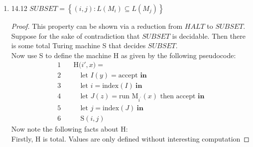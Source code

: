 \documentclass[10pt]{article}
\begin{document}
\begin{enumerate}[label={}]
\begin{proof}
                  Thus we know that $\mathcal{L}(H)=H A L T$ and $H$ is total. In other words, $H$ decides $H A L T$. However, $HALT$ is known to be undecidable (see Theorem 14.7 from the textbook). Thus, there is a contradiction, and the assumption that $HASEMPTY$ is decidable must be false. Therefore, $HASEMPTY$ is in fact undecidable.

            \end{proof}

            \newpage





      \item 14.12 $SUBSET=\left\{(i, j): L\left(M_i\right) \subseteq L\left(M_j\right)\right\}$

            \begin{proof}
                  This property can be shown via a reduction from $HALT$ to $SUBSET$.\\
                  Suppose for the sake of contradiction that $SUBSET$ is decidable.
                  Then there is some total Turing machine S that decides $SUBSET$.\\
                  Now use S to define the machine H as given by the following pseudocode:
                  $$\begin{aligned}
                              1 \quad & \text{H(}i', x\text{)} =                                                                       \\
                              2 \quad & \quad \text{let } I(y) = \text{accept } \textbf{in}                                            \\
                              3 \quad & \quad \text{let } i = \text{index}(I) \ \textbf{in}                                            \\
                              4 \quad & \quad \text{let } J(z) = \text{run } \text{M}_{i^{\prime}}(x) \text{ then accept } \textbf{in} \\
                              5 \quad & \quad \text{let } j = \text{index}(J) \ \textbf{in}                                            \\
                              6 \quad & \quad \text{S}(i, j)
                        \end{aligned}$$
                  Now note the following facts about H:\\
                  Firstly, H is total. Values are only defined without interesting computation

\end{proof}
\end{enumerate}
\end{document}

